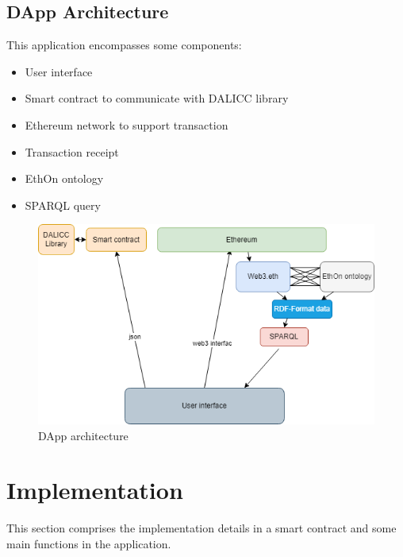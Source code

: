 \subsection{DApp Architecture} 
This application encompasses some components:
\begin{itemize}
	\item User interface
	\item Smart contract to communicate with DALICC library
	\item Ethereum network to support transaction
	\item Transaction receipt
	\item EthOn ontology
	\item SPARQL query    
\end{itemize} 
\begin{center}
   \begin{figure}[htb!]
		
		\begin{minipage}{0.75\linewidth}
			
			\includegraphics[width=1.5\textwidth]{images/chap03_eth_dalicc_comm.png}
		\end{minipage}
		\caption{DApp architecture}
	\end{figure}
\end{center}

\section{Implementation}
This section comprises the implementation details in a smart contract and some main functions in the application.

